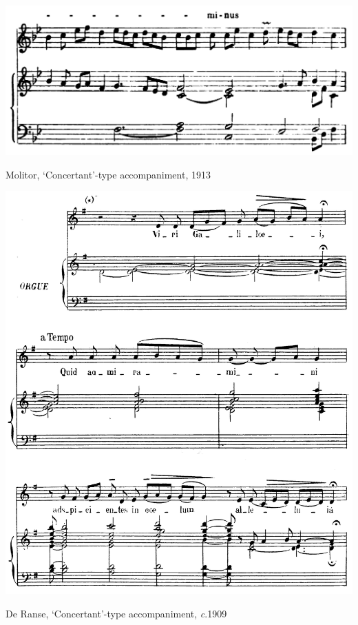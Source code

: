 \begin{example}
  \centering
  \includegraphics[width=\linewidth]{c/5/ex/molitor_melisma_99.jpg}
  \caption{Molitor, `Concertant'-type accompaniment, 1913}
  \label{mus:molitor_melisma_99}
\end{example}

\vspace*{\fill}

\newpage

\vspace*{\fill}

\begin{example}
  \centering
  \includegraphics[width=\linewidth]{c/4/ex/ranse.jpg}
  \caption{De Ranse, `Concertant'-type accompaniment, \emph{c}.1909}
  \label{mus:deranse_ascension}
\end{example}

